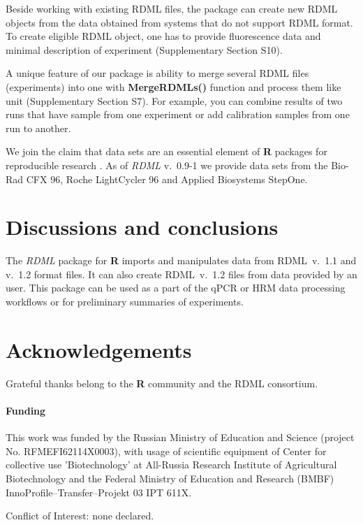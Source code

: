 \documentclass{bioinfo}
\begin{document}
	Beside working with existing RDML files, the package can create new RDML objects from
	the data obtained from systems that do not support RDML format. To create eligible RDML 
	object, one has to provide fluorescence data and minimal description of experiment
	(Supplementary Section S10).
	
	A unique feature of our package is ability to merge several RDML files
	(experiments) into one with \textbf{MergeRDMLs()} function and process them like
	unit (Supplementary Section S7). For example, you can combine results of two
	runs that have sample from one experiment or add calibration samples from one
	run to another.
	
	We join the claim that data sets are an essential element of \textbf{R} 
	packages for reproducible research \cite{roediger2015r}. As of \textit{RDML} 
	v.~0.9-1 we provide data sets from the Bio-Rad CFX 96, Roche LightCycler 96 and 
	Applied Biosystems StepOne.
	
	\section{Discussions and conclusions}
	
	The \textit{RDML} package for \textbf{R} imports and manipulates data from RDML~v.~1.1 and 
	v.~1.2 format files. It can also create RDML~v.~1.2 files from data provided by an user. 
	This package can be used as a part of the qPCR or HRM data processing workflows or 
	for preliminary summaries of experiments.
		
	\section{Acknowledgements}
	Grateful thanks belong to the \textbf{R} community and the RDML consortium.
	
	\paragraph{Funding\textcolon} This work was funded by the Russian 
	Ministry of Education and Science (project No. RFMEFI62114X0003), with usage of 
	scientific equipment of Center for collective use ’Biotechnology’ at All-Russia 
	Research Institute of Agricultural Biotechnology and the Federal Ministry of 
	Education and Research (BMBF) InnoProfile--Transfer--Projekt 03 IPT 611X.
	
	
	Conflict of Interest: none declared.

	
	
\end{document}
